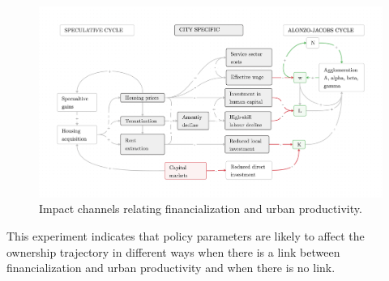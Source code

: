 \begin{figure}[h!tb]\label{fig-impact-channels}
\begin{adjustwidth}{-0.24\textwidth}{-0.24\textwidth}
\centering
\includegraphics[scale=.15 ]{fig/impact-channels.png}%
\end{adjustwidth}
\caption{Impact channels relating financialization and urban productivity.}
\end{figure}

This experiment indicates that policy parameters are likely to affect the ownership trajectory in different ways when there is a link between financialization and urban productivity and when there is no link.